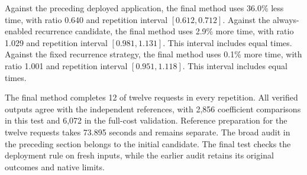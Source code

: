 Against the preceding deployed application, the final method uses 36.0\% less time, with ratio 0.640 and repetition interval $[0.612,0.712]$. Against the always-enabled recurrence candidate, the final method uses 2.9\% more time, with ratio 1.029 and repetition interval $[0.981,1.131]$. This interval includes equal times. Against the fixed recurrence strategy, the final method uses 0.1\% more time, with ratio 1.001 and repetition interval $[0.951,1.118]$. This interval includes equal times.

The final method completes 12 of twelve requests in every repetition. All verified outputs agree with the independent references, with 2,856 coefficient comparisons in this test and 6,072 in the full-cost validation. Reference preparation for the twelve requests takes 73.895 seconds and remains separate. The broad audit in the preceding section belongs to the initial candidate. The final test checks the deployment rule on fresh inputs, while the earlier audit retains its original outcomes and native limits.
